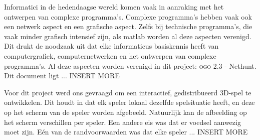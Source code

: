 Informatici in de hedendaagse wereld komen vaak in aanraking met het ontwerpen van complexe programma's. Complexe programma's hebben vaak ook een netwerk aspect en een grafische aspect. Zelfs bij technische programma's, die vaak minder grafisch intensief zijn, als matlab worden al deze aspecten verenigd. Dit drukt de noodzaak uit dat elke informaticus basiskennis heeft van computergrafiek, computernetwerken en het ontwerpen van complexe programma's. Al deze aspecten worden verenigd in dit project: \textsc{ogo} 2.3 - Nethunt. Dit document ligt ... INSERT MORE

Voor dit project werd ons gevraagd om een interactief, gedistribueerd 3D-spel te ontwikkelen. Dit houdt in dat elk speler lokaal dezelfde spelsituatie heeft, en deze op het scherm van de speler worden afgebeeld. Natuurlijk kan de afbeelding op het scherm verschillen per speler. Een andere eis was dat er voedsel aanwezig moet zijn. E\'en van de randvoorwaarden was dat elke speler ... INSERT MORE